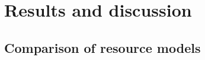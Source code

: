 \section{Results and discussion\label{results}}
\subsection{Comparison of resource models\label{model-results}}